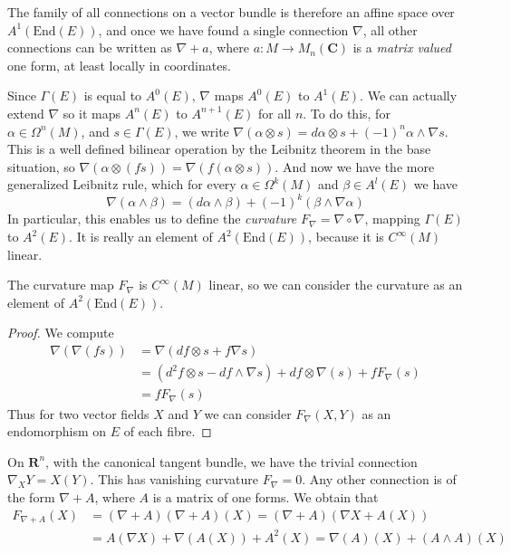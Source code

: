 \begin{remark}
    The family of all connections on a vector bundle is therefore an affine space over $A^1(\text{End}(E))$, and once we have found a single connection $\nabla$, all other connections can be written as $\nabla + a$, where $a: M \to M_n(\mathbf{C})$ is a {\it matrix valued} one form, at least locally in coordinates.
\end{remark}

Since $\Gamma(E)$ is equal to $A^0(E)$, $\nabla$ maps $A^0(E)$ to $A^1(E)$. We can actually extend $\nabla$ so it maps $A^n(E)$ to $A^{n+1}(E)$ for all $n$. To do this, for $\alpha \in \Omega^n(M)$, and $s \in \Gamma(E)$, we write $\nabla(\alpha \otimes s) = d\alpha \otimes s + (-1)^n \alpha \wedge \nabla s$. This is a well defined bilinear operation by the Leibnitz theorem in the base situation, so $\nabla(\alpha \otimes (fs)) = \nabla(f (\alpha \otimes s))$. And now we have the more generalized Leibnitz rule, which for every $\alpha \in \Omega^k(M)$ and $\beta \in A^l(E)$ we have
%
\[ \nabla(\alpha \wedge \beta) = (d\alpha \wedge \beta) + (-1)^k (\beta \wedge \nabla \alpha) \]
%
In particular, this enables us to define the \emph{curvature} $F_\nabla = \nabla \circ \nabla$, mapping $\Gamma(E)$ to $A^2(E)$. It is really an element of $A^2(\text{End}(E))$, because it is $C^\infty(M)$ linear.

\begin{theorem}
    The curvature map $F_\nabla$ is $C^\infty(M)$ linear, so we can consider the curvature as an element of $A^2(\text{End}(E))$.
\end{theorem}
\begin{proof}
    We compute
    \begin{align*}
        \nabla(\nabla(fs)) &= \nabla(df \otimes s + f \nabla s)\\
        &= (d^2f \otimes s - df \wedge \nabla s) + df \otimes \nabla(s) + f F_\nabla(s)\\
        &= f F_\nabla(s)
    \end{align*}
    Thus for two vector fields $X$ and $Y$ we can consider $F_\nabla(X,Y)$ as an endomorphism on $E$ of each fibre.
\end{proof}

\begin{example}
    On $\mathbf{R}^n$, with the canonical tangent bundle, we have the trivial connection $\nabla_X Y = X(Y)$. This has vanishing curvature $F_\nabla = 0$. Any other connection is of the form $\nabla + A$, where $A$ is a matrix of one forms. We obtain that
    \begin{align*}
        F_{\nabla + A}(X) &= (\nabla + A)(\nabla + A)(X) = (\nabla + A)(\nabla X + A(X))\\
        &= A(\nabla X) + \nabla(A(X)) + A^2(X) = \nabla(A)(X) + (A \wedge A)(X)
    \end{align*}
\end{example}






